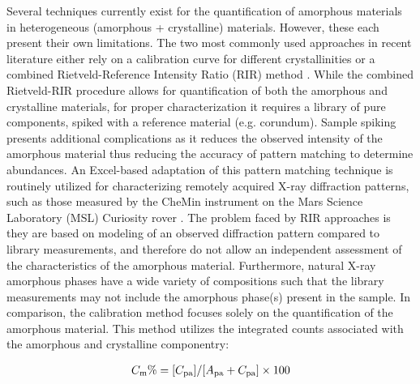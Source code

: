 \documentclass[review]{elsarticle}
\newcommand{\changed}{\color{blue}}
\begin{document}
Several techniques currently exist for the quantification of amorphous materials in heterogeneous (amorphous + crystalline) materials. However, these
each present their own limitations. The two most commonly used approaches in recent literature
either rely on a calibration curve for different crystallinities \citep[calibration method;][]{ rowe2012} or a combined Rietveld-Reference Intensity Ratio (RIR) method \citep{gualtieri1996, gualtieri2000}. While the combined Rietveld-RIR procedure allows for quantification of both the amorphous 
and crystalline materials, for proper characterization it requires a library of pure components,
spiked with a reference material (e.g. corundum). Sample spiking presents additional complications
as it reduces the observed intensity of the amorphous material thus reducing the accuracy of
pattern matching to determine abundances. An Excel-based adaptation of this pattern matching
technique \citep[FULLPAT;][]{chipera2002} is routinely utilized for characterizing remotely acquired X-ray
diffraction patterns, such as those {\changed measured by the CheMin instrument on} the Mars Science Laboratory (MSL) Curiosity rover \citep{blake2012, bish2013}. The problem faced by RIR approaches is they are based on modeling of an observed 
diffraction pattern compared to library measurements, and therefore do not allow an independent
assessment of the characteristics of the amorphous material. {\changed Furthermore, natural X-ray amorphous phases have a wide variety of compositions such that the library measurements may not include the amorphous phase(s) present in the sample.} In comparison, the calibration method
focuses solely on the quantification of the amorphous material. {\changed This method utilizes} the integrated counts
associated with the amorphous and crystalline componentry: 

\begin{align}
C_{\rm m} \% = [C_{\rm pa}]/[A_{\rm pa} + C_{\rm pa}] \times 100\label{eqn:definition}
\end{align}
\end{document}
